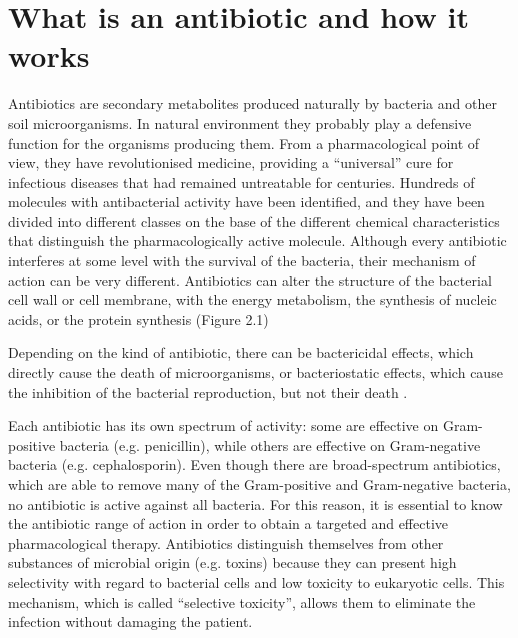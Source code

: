 \documentclass[11pt]{report}
\begin{document}
\chapter{What is an antibiotic and how it works}
Antibiotics are secondary metabolites produced naturally by bacteria and other soil microorganisms.
In natural environment they probably play a defensive function for the organisms producing them.
From a pharmacological point of view, they have revolutionised medicine, providing a “universal” cure for infectious diseases that had remained untreatable for centuries.
Hundreds of molecules with antibacterial activity have been identified, and they have been divided into different classes on the base of the different chemical characteristics that distinguish the pharmacologically active molecule.
Although every antibiotic interferes at some level with the survival of the bacteria, their mechanism of action can be very different.
Antibiotics can alter the structure of the bacterial cell wall or cell membrane, with the energy metabolism, the synthesis of nucleic acids, or the protein synthesis (Figure 2.1)

Depending on the kind of antibiotic, there can be bactericidal effects, which directly cause the death of microorganisms, or bacteriostatic effects, which cause the inhibition of the bacterial reproduction, but not their death \cite{Leekha2011}.

Each antibiotic has its own spectrum of activity: some are effective on Gram-positive bacteria (e.g. penicillin), while others are effective on Gram-negative bacteria (e.g. cephalosporin).
Even though there are broad-spectrum antibiotics, which are able to remove many of the Gram-positive and Gram-negative bacteria, no antibiotic is active against all bacteria.
For this reason, it is essential to know the antibiotic range of action in order to obtain a targeted and effective pharmacological therapy.
Antibiotics distinguish themselves from other substances of microbial origin (e.g. toxins) because they can present high selectivity with regard to bacterial cells and low toxicity to eukaryotic cells.
This mechanism, which is called “selective toxicity”, allows them to eliminate the infection without damaging the patient.
\end{document}
